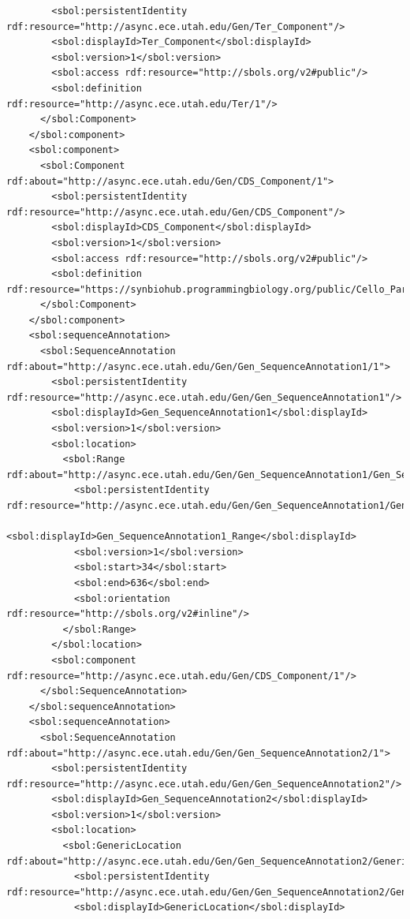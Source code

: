 \begin{lstlisting}
        <sbol:persistentIdentity rdf:resource="http://async.ece.utah.edu/Gen/Ter_Component"/>
        <sbol:displayId>Ter_Component</sbol:displayId>
        <sbol:version>1</sbol:version>
        <sbol:access rdf:resource="http://sbols.org/v2#public"/>
        <sbol:definition rdf:resource="http://async.ece.utah.edu/Ter/1"/>
      </sbol:Component>
    </sbol:component>
    <sbol:component>
      <sbol:Component rdf:about="http://async.ece.utah.edu/Gen/CDS_Component/1">
        <sbol:persistentIdentity rdf:resource="http://async.ece.utah.edu/Gen/CDS_Component"/>
        <sbol:displayId>CDS_Component</sbol:displayId>
        <sbol:version>1</sbol:version>
        <sbol:access rdf:resource="http://sbols.org/v2#public"/>
        <sbol:definition rdf:resource="https://synbiohub.programmingbiology.org/public/Cello_Parts/PhlF/1"/>
      </sbol:Component>
    </sbol:component>
    <sbol:sequenceAnnotation>
      <sbol:SequenceAnnotation rdf:about="http://async.ece.utah.edu/Gen/Gen_SequenceAnnotation1/1">
        <sbol:persistentIdentity rdf:resource="http://async.ece.utah.edu/Gen/Gen_SequenceAnnotation1"/>
        <sbol:displayId>Gen_SequenceAnnotation1</sbol:displayId>
        <sbol:version>1</sbol:version>
        <sbol:location>
          <sbol:Range rdf:about="http://async.ece.utah.edu/Gen/Gen_SequenceAnnotation1/Gen_SequenceAnnotation1_Range/1">
            <sbol:persistentIdentity rdf:resource="http://async.ece.utah.edu/Gen/Gen_SequenceAnnotation1/Gen_SequenceAnnotation1_Range"/>
            <sbol:displayId>Gen_SequenceAnnotation1_Range</sbol:displayId>
            <sbol:version>1</sbol:version>
            <sbol:start>34</sbol:start>
            <sbol:end>636</sbol:end>
            <sbol:orientation rdf:resource="http://sbols.org/v2#inline"/>
          </sbol:Range>
        </sbol:location>
        <sbol:component rdf:resource="http://async.ece.utah.edu/Gen/CDS_Component/1"/>
      </sbol:SequenceAnnotation>
    </sbol:sequenceAnnotation>
    <sbol:sequenceAnnotation>
      <sbol:SequenceAnnotation rdf:about="http://async.ece.utah.edu/Gen/Gen_SequenceAnnotation2/1">
        <sbol:persistentIdentity rdf:resource="http://async.ece.utah.edu/Gen/Gen_SequenceAnnotation2"/>
        <sbol:displayId>Gen_SequenceAnnotation2</sbol:displayId>
        <sbol:version>1</sbol:version>
        <sbol:location>
          <sbol:GenericLocation rdf:about="http://async.ece.utah.edu/Gen/Gen_SequenceAnnotation2/GenericLocation/1">
            <sbol:persistentIdentity rdf:resource="http://async.ece.utah.edu/Gen/Gen_SequenceAnnotation2/GenericLocation"/>
            <sbol:displayId>GenericLocation</sbol:displayId>

\end{lstlisting}
